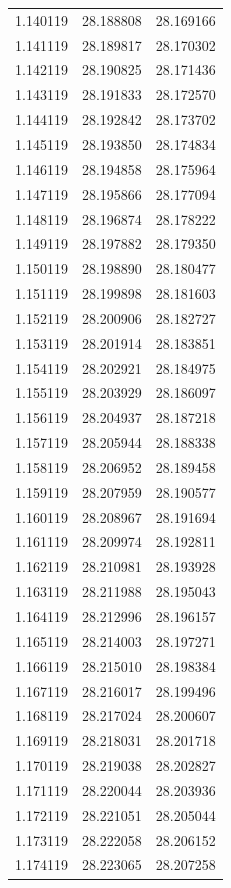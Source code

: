 \begin{tabular}{rrr}
1.140119 & 28.188808 & 28.169166 \\
1.141119 & 28.189817 & 28.170302 \\
1.142119 & 28.190825 & 28.171436 \\
1.143119 & 28.191833 & 28.172570 \\
1.144119 & 28.192842 & 28.173702 \\
1.145119 & 28.193850 & 28.174834 \\
1.146119 & 28.194858 & 28.175964 \\
1.147119 & 28.195866 & 28.177094 \\
1.148119 & 28.196874 & 28.178222 \\
1.149119 & 28.197882 & 28.179350 \\
1.150119 & 28.198890 & 28.180477 \\
1.151119 & 28.199898 & 28.181603 \\
1.152119 & 28.200906 & 28.182727 \\
1.153119 & 28.201914 & 28.183851 \\
1.154119 & 28.202921 & 28.184975 \\
1.155119 & 28.203929 & 28.186097 \\
1.156119 & 28.204937 & 28.187218 \\
1.157119 & 28.205944 & 28.188338 \\
1.158119 & 28.206952 & 28.189458 \\
1.159119 & 28.207959 & 28.190577 \\
1.160119 & 28.208967 & 28.191694 \\
1.161119 & 28.209974 & 28.192811 \\
1.162119 & 28.210981 & 28.193928 \\
1.163119 & 28.211988 & 28.195043 \\
1.164119 & 28.212996 & 28.196157 \\
1.165119 & 28.214003 & 28.197271 \\
1.166119 & 28.215010 & 28.198384 \\
1.167119 & 28.216017 & 28.199496 \\
1.168119 & 28.217024 & 28.200607 \\
1.169119 & 28.218031 & 28.201718 \\
1.170119 & 28.219038 & 28.202827 \\
1.171119 & 28.220044 & 28.203936 \\
1.172119 & 28.221051 & 28.205044 \\
1.173119 & 28.222058 & 28.206152 \\
1.174119 & 28.223065 & 28.207258 \\

\end{tabular}
